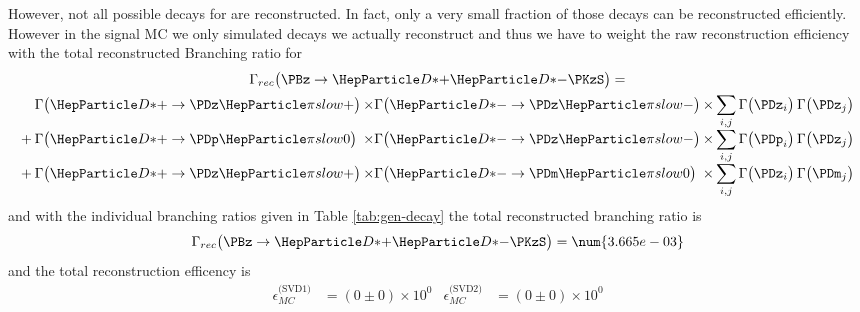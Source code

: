 \documentclass[a4paper]{report}
\def\ReconstructedBR{\num{3.665e-03}}
\def\ReconstructionEffSVDOne{(0 \pm 0)\times 10^0}
\def\ReconstructionEffSVDTwo{(0 \pm 0)\times 10^0}
\begin{document}
However, not all possible decays for \ddk are reconstructed. In fact, only a
very small fraction of those decays can be reconstructed efficiently. However in
the signal MC we only simulated decays we actually reconstruct and thus we
have to weight the raw reconstruction efficiency with the total reconstructed
Branching ratio for \ddk
\begin{multline}
    \BR_{rec}\big(\ddk\big) = \\
    \arraycolsep1pt
    \begin{array}[b]{*5{>{\displaystyle}l}}
    &\BR\big(\PDstp \rightarrow \PDz\Pgpps\big) &\times \BR\big(\PDstm \rightarrow
    \PDz\Pgpms\big) &\times \sum_{i,j} \BR\big(\PDz_i\big)&\BR\big(\PDz_j\big) \\
     +&\BR\big(\PDstp \rightarrow \PDp\Pgpzs\big) &\times \BR\big(\PDstm \rightarrow
    \PDz\Pgpms\big) &\times \sum_{i,j} \BR\big(\PDp_i\big)&\BR\big(\PDz_j\big)\\
     +&\BR\big(\PDstp \rightarrow \PDz\Pgpps\big) &\times \BR\big(\PDstm \rightarrow
    \PDm\Pgpzs\big) &\times \sum_{i,j} \BR\big(\PDz_i\big)&\BR\big(\PDm_j\big)
    \end{array}
\end{multline}
and with the individual branching ratios given in Table \ref{tab:gen-decay} the
total reconstructed branching ratio is
\begin{equation}
    \BR_{rec}\big(\ddk\big) = \ReconstructedBR
\end{equation}
and the total reconstruction efficency is
\begin{align}
    \epsilon_{MC}^{\text{(SVD1)}} & = \ReconstructionEffSVDOne &
    \epsilon_{MC}^{\text{(SVD2)}} & = \ReconstructionEffSVDTwo
\end{align}
\end{document}
